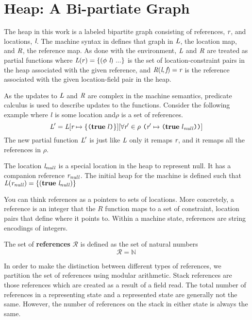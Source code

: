 \section{Heap: A Bi-partiate Graph}

The heap in this work is a labeled bipartite graph consisting of
references, $\emph{r}$, and locations, $\emph{l}$. The machine
syntax in  defines that graph in
$\emph{L}$, the location map, and $\emph{R}$, the reference map. As
done with the environment, $\emph{L}$ and $\emph{R}$ are treated as
partial functions where $\cfgnt{L}(r) = \{(\phi\ \cfgnt{l})\ ...\}$ is
the set of location-constraint pairs in the heap associated with the
given reference, and $\emph{R}(\emph{l},\emph{f}) = \emph{r}$ is
the reference associated with the given location-field pair in the
heap.

As the updates to $\emph{L}$ and $\emph{R}$ are complex in the
machine semantics, predicate calculus is used to describe updates to
the functions. Consider the following example where $\emph{l}$ is
some location and$\rho$ is a set of references.
\[
\cfgnt{L}^\prime = \cfgnt{L}[\cfgnt{r} \mapsto \{\lp \cfgt{true}\ l\rp \}][\forall \cfgnt{r}^\prime \in \rho\ \lp \cfgnt{r}^\prime \mapsto \lp \cfgt{true}\ l_\mathit{null}\rp \rp ]
\]
The new partial function $\emph{L}^\prime$ is just like $\emph{L}$
only it remaps $\emph{r}$, and it remaps all the references in
$\rho$.

The location $\emph{l}_\mathit{null}$ is a special location in the
heap to represent null. It has a companion reference
$\emph{r}_\mathit{null}$. The initial heap for the machine is defined
such that $\emph{L}(\emph{r}_\mathit{null}) =
\{(\textbf{true}\ \emph{l}_\mathit{null})\}$

You can think references as a pointers to sets of locations. More
concretely, a reference is an integer that the $R$ function maps to a
set of constraint, location pairs that define where it points
to. Within a machine state, references are string encodings of
integers.

\begin{definition}
The set of \textbf{references} $\mathcal{R}$ is defined as the set of natural numbers
 $$\mathcal{R} = \mathbb{N}$$
\end{definition}

In order to make the distinction between different types of references, we partition the set of references using modular arithmetic. Stack references are those references which are created as a result of a field read. The total number of references in a representing state and a represented state are generally not the same. However, the number of references on the stack in either state is always the same. 

